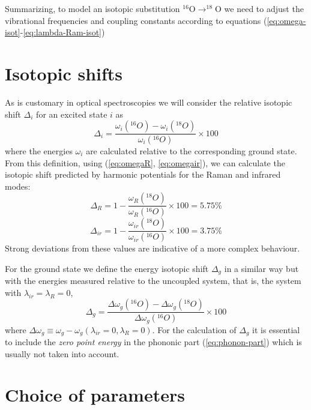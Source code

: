 Summarizing, to model an isotopic substitution $^{16}$O$\rightarrow ^{18}$O we need to adjust the vibrational frequencies and coupling constants according to equations (\ref{eq:omega-isot}-\ref{eq:lambda-Ram-isot})

\section{Isotopic shifts}

As is customary in optical spectroscopies we will consider the relative isotopic shift $\Delta_i$ for an excited state $i$ as 
%
\begin{equation}
  \label{eq:isot-shift-def-exc}
  \Delta_i = \frac{\omega_i(^{16}O)- \omega_i(^{18}O)}{\omega_i(^{16}O)} \times 100
\end{equation}
%
where the energies $\omega_i$ are calculated relative to the corresponding ground state.
From this definition, using (\ref{eq:omegaR}, \ref{eq:omegair}), we can calculate the isotopic shift predicted by harmonic potentials for the Raman and infrared modes:
%
\begin{equation}
  \label{eq:isot-harm-R}
  \Delta_{R} = 1 - \frac{\omega_{R}(^{18}O)}{\omega_{R}(^{16}O)} \times 100 = 5.75\% 
\end{equation}
%
\begin{equation}
  \label{eq:isot-harm-ir}
  \Delta_{ir} = 1 - \frac{\omega_{ir}(^{18}O)}{\omega_{ir}(^{16}O)} \times 100 = 3.75\%
\end{equation}
%
Strong deviations from these values are indicative of a more complex behaviour.


For the ground state we define the energy isotopic shift $\Delta_g$ in a similar way but with the energies measured relative to the uncoupled system, that is, the system with $\lambda_{ir}=\lambda_R=0$,
%
\begin{equation}
  \label{eq:isot-shift-def-grd}
  \Delta_g = \frac{\Delta\omega_g(^{16}O)- \Delta\omega_g(^{18}O)}{\Delta \omega_g(^{16}O)} \times 100
\end{equation}
%
where $\Delta\omega_g \equiv \omega_g - \omega_g(\lambda_{ir}=0, \lambda_R=0)$. 
For the calculation of $\Delta_g$ it is essential to include the \textit{zero point energy} in the phononic part (\ref{eq:phonon-part}) which is usually not taken into account.

\section{Choice of parameters}
\label{sec:model-parameters}


